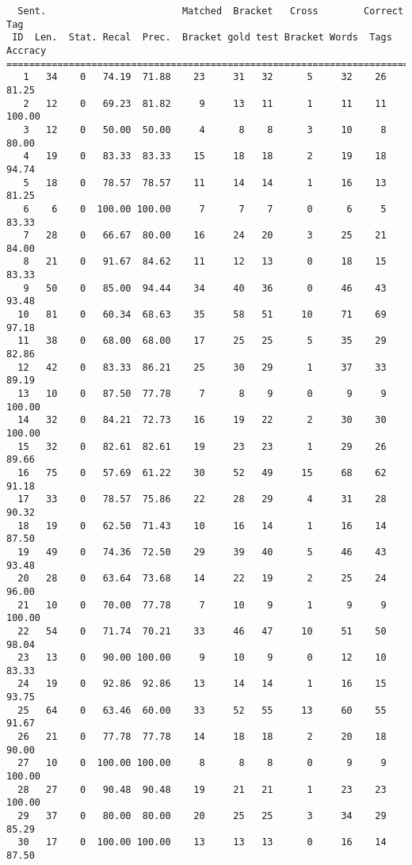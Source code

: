 \scriptsize
\begin{verbatim}
  Sent.                        Matched  Bracket   Cross        Correct Tag
 ID  Len.  Stat. Recal  Prec.  Bracket gold test Bracket Words  Tags Accracy
============================================================================
   1   34    0   74.19  71.88    23     31   32      5     32    26    81.25
   2   12    0   69.23  81.82     9     13   11      1     11    11   100.00
   3   12    0   50.00  50.00     4      8    8      3     10     8    80.00
   4   19    0   83.33  83.33    15     18   18      2     19    18    94.74
   5   18    0   78.57  78.57    11     14   14      1     16    13    81.25
   6    6    0  100.00 100.00     7      7    7      0      6     5    83.33
   7   28    0   66.67  80.00    16     24   20      3     25    21    84.00
   8   21    0   91.67  84.62    11     12   13      0     18    15    83.33
   9   50    0   85.00  94.44    34     40   36      0     46    43    93.48
  10   81    0   60.34  68.63    35     58   51     10     71    69    97.18
  11   38    0   68.00  68.00    17     25   25      5     35    29    82.86
  12   42    0   83.33  86.21    25     30   29      1     37    33    89.19
  13   10    0   87.50  77.78     7      8    9      0      9     9   100.00
  14   32    0   84.21  72.73    16     19   22      2     30    30   100.00
  15   32    0   82.61  82.61    19     23   23      1     29    26    89.66
  16   75    0   57.69  61.22    30     52   49     15     68    62    91.18
  17   33    0   78.57  75.86    22     28   29      4     31    28    90.32
  18   19    0   62.50  71.43    10     16   14      1     16    14    87.50
  19   49    0   74.36  72.50    29     39   40      5     46    43    93.48
  20   28    0   63.64  73.68    14     22   19      2     25    24    96.00
  21   10    0   70.00  77.78     7     10    9      1      9     9   100.00
  22   54    0   71.74  70.21    33     46   47     10     51    50    98.04
  23   13    0   90.00 100.00     9     10    9      0     12    10    83.33
  24   19    0   92.86  92.86    13     14   14      1     16    15    93.75
  25   64    0   63.46  60.00    33     52   55     13     60    55    91.67
  26   21    0   77.78  77.78    14     18   18      2     20    18    90.00
  27   10    0  100.00 100.00     8      8    8      0      9     9   100.00
  28   27    0   90.48  90.48    19     21   21      1     23    23   100.00
  29   37    0   80.00  80.00    20     25   25      3     34    29    85.29
  30   17    0  100.00 100.00    13     13   13      0     16    14    87.50

\end{verbatim}
